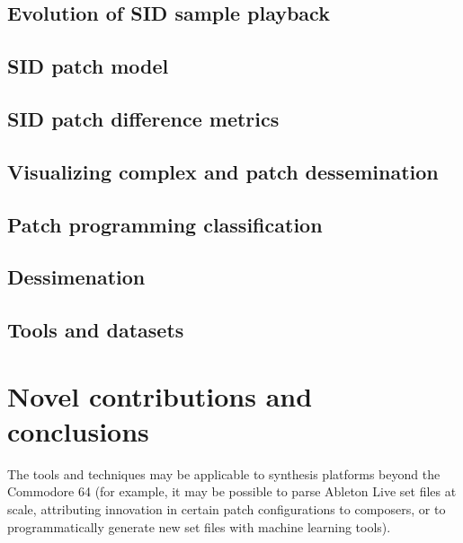 \documentclass[10pt]{article}
\begin{document}
\begin{multicols*}{2}
  \subsection{Evolution of SID sample playback}

  \subsection{SID patch model}

  \subsection{SID patch difference metrics}

  \subsection{Visualizing complex and patch dessemination}

  \subsection{Patch programming classification}

  \subsection{Dessimenation}

  \subsection{Tools and datasets}

\section{Novel contributions and conclusions}

The tools and techniques may be applicable to synthesis platforms
beyond the Commodore 64 (for example, it may be possible to parse
Ableton Live set files at scale, attributing innovation in certain
patch configurations to composers, or to programmatically generate new
set files with machine learning tools).





\end{multicols*}
\end{document}
